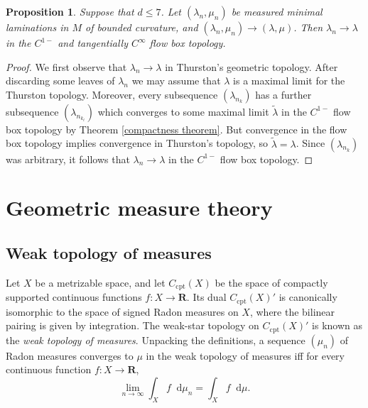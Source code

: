 \documentclass[reqno,11pt]{amsart}
\newcommand{\RR}{\mathbf{R}}
\newcommand*\dif{\mathop{}\!\mathrm{d}}
\newcommand{\dfn}[1]{\emph{#1}\index{#1}}
\newcommand{\cpt}{\mathrm{cpt}}
\newtheorem{proposition}[theorem]{Proposition}
\theoremstyle{definition}
\numberwithin{equation}{section}
\begin{document}
\begin{proposition}\label{convergence of traansverse measures means flow box convergence}
Suppose that $d \leq 7$.
Let $(\lambda_n, \mu_n)$ be measured minimal laminations in $M$ of bounded curvature, and $(\lambda_n, \mu_n) \to (\lambda, \mu)$.
Then $\lambda_n \to \lambda$ in the $C^{1-}$ and tangentially $C^\infty$ flow box topology.
\end{proposition}
\begin{proof}
We first observe that $\lambda_n \to \lambda$ in Thurston's geometric topology.
After discarding some leaves of $\lambda_n$ we may assume that $\lambda$ is a maximal limit for the Thurston topology.
Moreover, every subsequence $(\lambda_{n_k})$ has a further subsequence $(\lambda_{n_{k_\ell}})$ which converges to some maximal limit $\tilde \lambda$ in the $C^{1-}$ flow box topology by Theorem \ref{compactness theorem}.
But convergence in the flow box topology implies convergence in Thurston's topology, so $\tilde \lambda = \lambda$.
Since $(\lambda_{n_k})$ was arbitrary, it follows that $\lambda_n \to \lambda$ in the $C^{1-}$ flow box topology.
\end{proof}

\appendix 
\section{Geometric measure theory}\label{boundary appendix}
\subsection{Weak topology of measures}
Let $X$ be a metrizable space, and let $C_\cpt(X)$ be the space of compactly supported continuous functions $f: X \to \RR$.
Its dual $C_\cpt(X)'$ is canonically isomorphic to the space of signed Radon measures on $X$, where the bilinear pairing is given by integration.
The weak-star topology on $C_\cpt(X)'$ is known as the \dfn{weak topology of measures}.
Unpacking the definitions, a sequence $(\mu_n)$ of Radon measures converges to $\mu$ in the weak topology of measures iff for every continuous function $f: X \to \RR$,
$$\lim_{n \to \infty} \int_X f \dif \mu_n = \int_X f \dif \mu.$$
\end{document}
